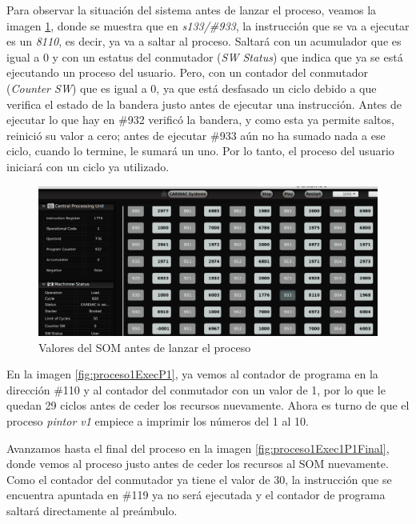 \documentclass[letterpaper,12pt,oneside]{book}
\begin{document}
		Para observar la situación del sistema antes de lanzar el proceso, veamos la imagen \ref{fig:lanzaExec1Prev},
		donde se muestra que en \textit{s133/\#933}, la instrucción que se va a ejecutar es un \textit{8110}, es decir, ya va a saltar al proceso. 
		Saltará con un 
		acumulador que es igual a 0
		y con un estatus del conmutador (\textit{SW Status}) que indica que ya se está ejecutando un proceso del usuario. Pero, con un contador del 
		conmutador (\textit{Counter SW}) que es igual a 0, ya que está desfasado un ciclo debido a que verifica el estado de la bandera justo antes de 
		ejecutar una instrucción. Antes de ejecutar lo que hay
		en \#932 verificó la bandera, y como esta ya permite saltos, reinició su valor a cero; antes de ejecutar  \#933 aún no ha sumado nada a ese 
		ciclo, cuando lo termine, le 
		sumará un uno. Por lo tanto, el proceso del usuario iniciará con un ciclo ya utilizado.
	


				
		

		\begin{figure}[h]		
			\centering
			\includegraphics[scale=0.4]{media/CARDIACC/LanzamientoExec1Prev.png}
			\caption{ Valores del SOM antes de lanzar el proceso}
			\label{fig:lanzaExec1Prev}
		\end{figure}		
		
		En la imagen \ref{fig:proceso1ExecP1}, ya vemos al contador de programa en la dirección \#110 y al contador del conmutador
		con un valor de 1, por lo que le quedan 29 
		ciclos antes 
		de ceder los recursos nuevamente. 
		Ahora es turno de que el proceso \textit{pintor v1} empiece a imprimir los números del 1 al 10. 
		
		Avanzamos hasta el final del proceso en la imagen
		\ref{fig:proceso1Exec1P1Final}, donde vemos al proceso justo antes de ceder los recursos al SOM nuevamente. Como el contador del conmutador ya tiene el 
		valor de 30, la instrucción que se encuentra apuntada
		en \#119 ya no será ejecutada y el contador de programa saltará directamente al preámbulo.
  
\end{document}
